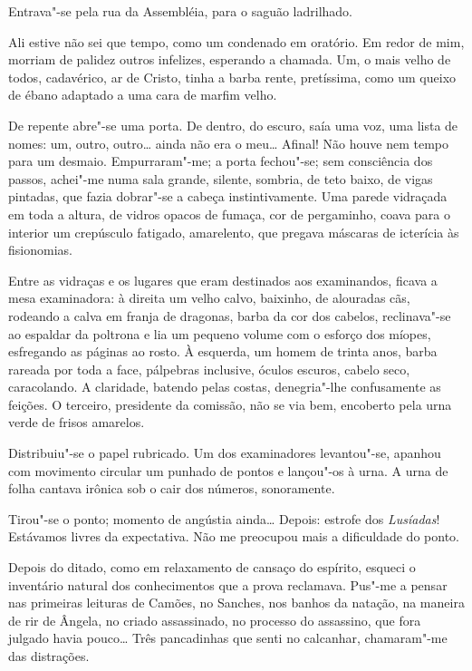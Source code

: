 Entrava"-se pela rua da Assembléia, para o saguão ladrilhado. 

Ali estive não sei que tempo, como um condenado em
oratório. Em redor de mim, morriam de palidez outros infelizes,
esperando a chamada. Um, o mais velho de todos, cadavérico, ar de
Cristo, tinha a barba rente, pretíssima, como um queixo de ébano
adaptado a uma cara de marfim velho. 

De repente abre"-se uma porta. De
dentro, do escuro, saía uma voz, uma lista de nomes: um, outro,
outro\ldots{} ainda não era o meu\ldots{} Afinal! Não houve nem tempo para um
desmaio. Empurraram"-me; a porta fechou"-se; sem consciência dos
passos, achei"-me numa sala grande, silente, sombria, de teto baixo,
de vigas pintadas, que fazia dobrar"-se a cabeça instintivamente. Uma
parede vidraçada em toda a altura, de vidros opacos de fumaça, cor de
pergaminho, coava para o interior um crepúsculo fatigado, amarelento,
que pregava máscaras de icterícia às fisionomias. 

Entre as vidraças e
os lugares que eram destinados aos examinandos, ficava a mesa
examinadora: à direita um velho calvo, baixinho, de alouradas cãs,
rodeando a calva em franja de dragonas, barba da cor dos cabelos,
reclinava"-se ao espaldar da poltrona e lia um pequeno volume com o
esforço dos míopes, esfregando as páginas ao rosto. À esquerda, um
homem de trinta anos, barba rareada por toda a face, pálpebras
inclusive, óculos escuros, cabelo seco, caracolando. A claridade,
batendo pelas costas, denegria"-lhe confusamente as feições. O
terceiro, presidente da comissão, não se via bem, encoberto pela urna
verde de frisos amarelos. 

Distribuiu"-se o papel rubricado. Um dos
examinadores levantou"-se, apanhou com movimento circular um punhado
de pontos e lançou"-os à urna. A urna de folha cantava irônica sob o
cair dos números, sonoramente. 

Tirou"-se o ponto; momento de angústia
ainda\ldots{} Depois: estrofe dos \textit{Lusíadas}! Estávamos livres da expectativa.
Não me preocupou mais a dificuldade do ponto. 


Depois do ditado, como em
relaxamento de cansaço do espírito, esqueci o inventário natural dos
conhecimentos que a prova reclamava. Pus"-me a pensar nas primeiras
leituras de Camões, no Sanches, nos banhos da natação, na maneira de
rir de Ângela, no criado assassinado, no processo do assassino, que
fora julgado havia pouco\ldots{} Três pancadinhas que senti no calcanhar,
chamaram"-me das distrações. 

